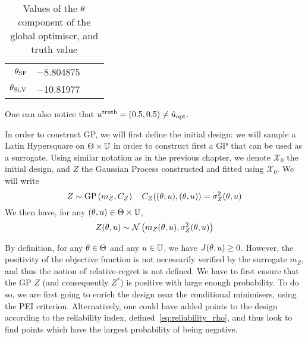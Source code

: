 \documentclass[../../Main_ManuscritThese.tex]{subfiles}
\begin{document}
\begin{table}[!h]
\begin{tabular}{rrrr}
    $\theta_{\mathrm{SF}}$   & \num[round-mode=places,round-precision=4]{-8.804875}                                                                                                                                                                                                                                        &                          &                                                                         \\
    $\theta_{\mathrm{Si,V}}$ & \num[round-mode=places,round-precision=4]{-10.81977}                                                                                                                                                                                                                                        &                          &                                                                         \\ \bottomrule
  \end{tabular}
  \caption{\label{tab:ktruthkopt} Values of the $\theta$ component of the global optimiser, and truth value}
\end{table}
One can also notice that $u^{\mathrm{truth}}=(\num{0.5},\num{0.5}) \neq \hat{u}_{\mathrm{opt}}$.


In order to construct GP, we will first define the initial design: we
will sample a Latin Hypersquare on $\Theta \times \mathbb{U}$ in order
to construct first a GP that can be used as a surrogate. Using similar
notation as in the previous chapter, we denote $\mathcal{X}_0$ the
initial design, and $Z$ the Gaussian Process constructed and fitted
using $\mathcal{X}_0$.  We will write
\begin{equation}
  Z \sim \operatorname{\mathrm{GP}}\left(m_Z, C_Z\right) \quad C_Z((\theta, u),(\theta, u)) = \sigma^2_Z(\theta, u)
\end{equation}
We then have, for any $(\theta, u) \in \Theta\times\mathbb{U}$,
\begin{equation}
  Z(\theta, u) \sim \mathcal{N}\left(m_Z(\theta, u), \sigma^2_Z(\theta, u)\right)
\end{equation}

By definition, for any $\theta\in \Theta$ and any $u \in \mathbb{U}$, we
have $J(\theta, u) \geq 0$.  However, the positivity of the objective
function is not necessarily verified by the surrogate $m_Z$, and thus
the notion of relative-regret is not defined. We have to first ensure
that the GP $Z$ (and consequently $Z^*$) is positive with large enough
probability.  To do so, we are first going to enrich the design near
the conditional minimisers, using the PEI criterion.  Alternatively,
one could have added points to the design according to the reliability
index, defined~\cref{eq:reliability_rho}, and thus look to find points
which have the largest probability of being negative.
\end{document}

